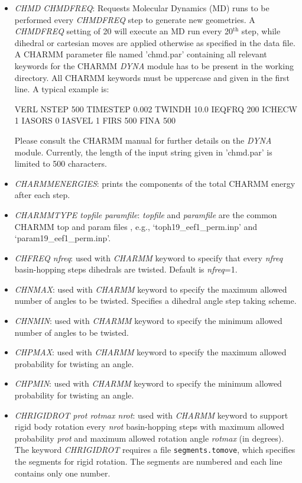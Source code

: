 \documentclass[12pt,a4paper,dvips]{article}
\begin{document}
\begin{itemize}
\item {\it CHMD CHMDFREQ\/}: Requests Molecular Dynamics (MD) runs to be performed every {\it CHMDFREQ} step to generate new geometries. A {\it CHMDFREQ} setting of 20 will execute an MD run every 20$^\mathrm{th}$ step, while dihedral or cartesian moves are applied otherwise as specified in the data file. A CHARMM parameter file named 'chmd.par' containing all relevant keywords for the CHARMM {\it DYNA} module has to be present in the working directory. All CHARMM keywords must be uppercase and given in the first line. A typical example is:

VERL NSTEP 500 TIMESTEP 0.002 TWINDH 10.0 IEQFRQ 200 ICHECW 1 IASORS 0 IASVEL 1 FIRS 500 FINA 500 

Please consult the CHARMM manual for further details on the {\it DYNA} module. Currently, the length of the input string given in 'chmd.par' is limited to 500 characters.

\item{\it CHARMMENERGIES}: prints the components of the total CHARMM energy after each step.

\item {\it CHARMMTYPE topfile paramfile\/}:  {\it topfile} and {\it paramfile} are the
common CHARMM top and param files , e.g., `toph19\_eef1\_perm.inp' and `param19\_eef1\_perm.inp'.

\item{\it CHFREQ nfreq}: used with {\it CHARMM} keyword to specify that every
{\it nfreq} basin-hopping steps dihedrals are twisted. Default is {\it nfreq}=1.

\item{\it CHNMAX}: used with {\it CHARMM} keyword to specify the maximum allowed
number of angles to be twisted. Specifies a dihedral angle step taking scheme. 

\item{\it CHNMIN}: used with {\it CHARMM} keyword to specify the minimum allowed
number of angles to be twisted.

\item{\it CHPMAX}: used with {\it CHARMM} keyword to specify the maximum allowed
probability for twisting an angle.

\item{\it CHPMIN}: used with {\it CHARMM} keyword to specify the minimum allowed
probability for twisting an angle.

\item{\it CHRIGIDROT prot rotmax nrot}: used with {\it CHARMM} keyword 
to support rigid body rotation every {\it nrot} basin-hopping steps with maximum allowed 
probability {\it prot} and maximum allowed rotation angle {\it rotmax} (in degrees). 
The keyword {\it CHRIGIDROT} requires a file {\tt segments.tomove}, which specifies
the segments for rigid rotation. The segments are numbered and each line contains only one number.


\end{itemize}
\end{document}
